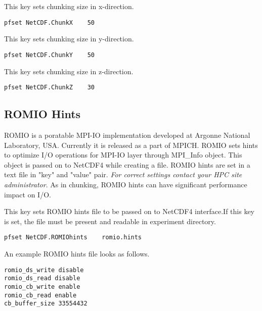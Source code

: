 {This key sets chunking size in x-direction.} 
\begin{display}\begin{verbatim}
pfset NetCDF.ChunkX    50
\end{verbatim}\end{display}

{This key sets chunking size in y-direction.} 
\begin{display}\begin{verbatim}
pfset NetCDF.ChunkY    50
\end{verbatim}\end{display}

{This key sets chunking size in z-direction.} 
\begin{display}\begin{verbatim}
pfset NetCDF.ChunkZ    30
\end{verbatim}\end{display}

\subsection{ROMIO Hints}
ROMIO is a poratable MPI-IO implementation developed at Argonne National Laboratory, USA. Currently it is released as a part of MPICH. ROMIO sets hints to optimize I/O operations for MPI-IO layer through MPI\_Info object. This object is passed on to NetCDF4 while creating a file. ROMIO hints are set in a text file in "key" and "value" pair. \textit{For correct settings contact your HPC site administrator}. As in chunking, ROMIO hints can have significant performance impact on I/O.

{This key sets ROMIO hints file to be passed on to NetCDF4 interface.If this key is set, the file must be present and readable in experiment directory.} 
\begin{display}\begin{verbatim}
pfset NetCDF.ROMIOhints    romio.hints
\end{verbatim}\end{display}
An example ROMIO hints file looks as follows.
\begin{display}\begin{verbatim}
romio_ds_write disable
romio_ds_read disable
romio_cb_write enable
romio_cb_read enable
cb_buffer_size 33554432
\end{verbatim}\end{display}

